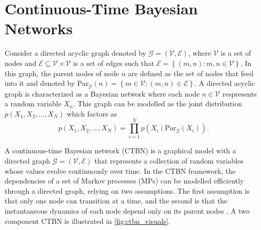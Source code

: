 \section{Continuous-Time Bayesian Networks}
\label{sec:ctbn_intro}
Consider a directed acyclic graph denoted by $ \mathcal{G} = \left( \mathcal{V}, \mathcal{E}\right) $, where $ \mathcal{V} $ is a set of nodes and $ \mathcal{E} \subseteq \mathcal{V} \times \mathcal{V} $ is a set of edges such that $ \mathcal{E} = \left\lbrace \left( m, n\right) : m, n \in \mathcal{V} \right\rbrace $. In this graph, the parent nodes of node $ n $ are defined as the set of nodes that feed into it and denoted by $ \mathrm{Par}_{\mathcal{G}}(n) = \left\lbrace m \in \mathcal{V} : \left( m, n \right) \in \mathcal{E} \right\rbrace $. A directed acyclic graph is characterized as a Bayesian network where each node $ n \in \mathcal{V} $ respresents a random variable $ X_n $. This graph can be modelled as the joint distribution $ p(X_1, X_2, ..., X_N) $ which factors as 
\begin{equation}
p(X_1, X_2, ..., X_N) = \prod_{i=1}^{N} p(X_i \mid \mathrm{Par}_{\mathcal{G}}(X_i)).
\end{equation}\par
A continuous-time Bayesian network (CTBN) is a graphical model with a directed graph $\mathcal{G} = \left( \mathcal{V}, \mathcal{E}\right) $ that represents a collection of random variables whose values evolve continuously over time. In the CTBN framework, the dependencies of a set of Markov processes (MPs) can be modelled efficiently through a directed graph, relying on two assumptions. The first assumption is that only one node can transition at a time, and the second is that the instantaneous dynamics of each node depend only on its parent nodes \cite{Cohn2010a, Nodelman1995}. A two component CTBN is illustrated in \autoref{fig:ctbn_visuals}.
